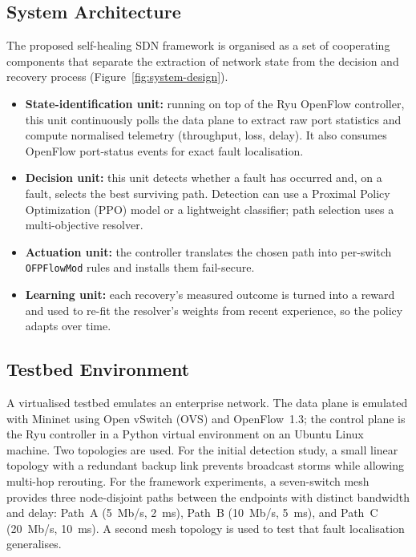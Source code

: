\documentclass[12pt,a4paper]{report}
\begin{document}
\subsection{System Architecture}
The proposed self-healing SDN framework is organised as a set of cooperating components that
separate the extraction of network state from the decision and recovery process
(Figure~\ref{fig:system-design}).
\begin{itemize}
\item \textbf{State-identification unit:} running on top of the Ryu OpenFlow controller,
this unit continuously polls the data plane to extract raw port statistics and compute
normalised telemetry (throughput, loss, delay). It also consumes OpenFlow port-status events
for exact fault localisation.
\item \textbf{Decision unit:} this unit detects whether a fault has occurred and, on a
fault, selects the best surviving path. Detection can use a Proximal Policy Optimization
(PPO) model or a lightweight classifier; path selection uses a multi-objective resolver.
\item \textbf{Actuation unit:} the controller translates the chosen path into per-switch
\texttt{OFPFlowMod} rules and installs them fail-secure.
\item \textbf{Learning unit:} each recovery's measured outcome is turned into a reward and
used to re-fit the resolver's weights from recent experience, so the policy adapts over time.
\end{itemize}

\subsection{Testbed Environment}
A virtualised testbed emulates an enterprise network. The data plane is emulated with
Mininet using Open vSwitch (OVS) and OpenFlow~1.3; the control plane is the Ryu controller in
a Python virtual environment on an Ubuntu Linux machine. Two topologies are used. For the
initial detection study, a small linear topology with a redundant backup link prevents
broadcast storms while allowing multi-hop rerouting. For the framework experiments, a
seven-switch mesh provides three node-disjoint paths between the endpoints with distinct
bandwidth and delay: Path~A (5~Mb/s, 2~ms), Path~B (10~Mb/s, 5~ms), and Path~C (20~Mb/s,
10~ms). A second mesh topology is used to test that fault localisation generalises.
\end{document}
